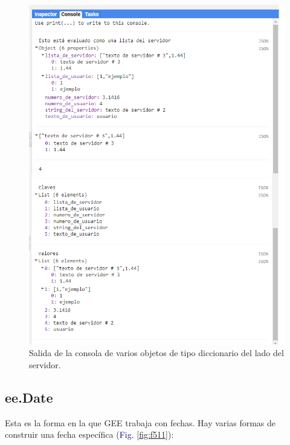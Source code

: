 \documentclass[
  12pt,
  letterpaper,
  twoside]{book}
\begin{document}
\begin{figure}[H]

{\centering \includegraphics[width=0.95\linewidth]{Img/ej7} 

}

\caption{Salida de la consola de varios objetos de tipo diccionario del lado del servidor.}\label{fig:f510}
\end{figure}

\hypertarget{ee.date}{%
\subsection*{ee.Date}\label{ee.date}}

Esta es la forma en la que GEE trabaja con fechas. Hay varias formas de construir una fecha específica (\textcolor{darkblue}{Fig.} \ref{fig:f511}):
\end{document}
